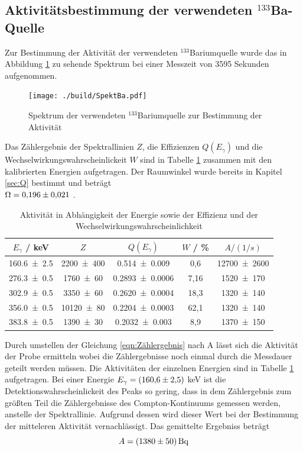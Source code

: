 \subsection{Aktivitätsbestimmung der verwendeten $^{133}$Ba-Quelle}
Zur Bestimmung der Aktivität der verwendeten $^{133}$Bariumquelle wurde das in Abbildung \ref{fig:BA} zu sehende Spektrum bei einer Messzeit von 3595 Sekunden aufgenommen.
\begin{figure}[H]
  \centering
  \texttt{[image: ./build/SpektBa.pdf]}
  \caption{Spektrum der verwendeten $^{133}$Bariumquelle zur Bestimmung der Aktivität}
  \label{fig:BA}
\end{figure}
Das Zählergebnis der Spektrallinien $Z$, die Effizienzen $Q(E_\gamma)$ und die Wechselwirkungswahrscheinlickeit $W$ sind in Tabelle \ref{tab:Ba} zusammen mit den kalibrierten Energien aufgetragen. Der Raumwinkel wurde bereits in Kapitel \ref{sec:Q} bestimmt und beträgt \\
$\Omega = \num{0,196 +- 0,021}$ .
\begin{table}
  \centering
  \caption{Aktivität in Abhängigkeit der Energie sowie der Effizienz und der Wechselwirkungswahrscheinlichkeit}
  \begin{tabular}{c c c c c}
    \toprule
	$E_\gamma$ / keV & $Z$ & $Q(E_\gamma)$ & $W$ / \%  & $A / (1/s)$\\
    \hline
    \num{160,6 +- 2,5}	& \num{2200 +- 400}	&\num{0,514 +- 0,009}      	& 0,6	&\num{12700 +- 2600}      \\
    \num{276,3 +- 0,5}  & \num{1760 +- 60}	&\num{0,2893 +- 0,0006} 	& 7,16 	&\num{1520 +- 170}  	\\
    \num{302,9 +- 0,5}	& \num{3350 +- 60} 	&\num{0,2620 +- 0,0004} 	& 18,3	&\num{1320 +- 140}   	\\
    \num{356,0 +- 0,5}	& \num{10120 +-	80}	&\num{0,2204 +- 0,0003} 	& 62,1	&\num{1320 +- 140}  	\\
    \num{383,8 +- 0,5}	& \num{1390 +- 30}	&\num{0,2032 +- 0,003} 		& 8,9	&\num{1370 +- 150}  	\\
    \bottomrule
  \end{tabular}
  \label{tab:Ba}
\end{table}
Durch umstellen der Gleichung \ref{eqn:Zählergebnis} nach A lässt sich die Aktivität der Probe ermitteln wobei die Zählergebnisse noch einmal durch die Messdauer geteilt werden müssen. Die Aktivitäten der einzelnen Energien sind in Tabelle \ref{tab:Ba} aufgetragen. Bei einer Energie $E_\gamma = (\num{160,6 +- 2,5})$ keV ist die Detektionswahrscheinlickeit des Peaks so gering, dass in dem  Zählergebnis zum größten Teil die Zählergebnisse des Compton-Kontinuums gemessen werden, anstelle der Spektrallinie. Aufgrund dessen wird dieser Wert bei der Bestimmung der mitteleren Aktivität vernachlässigt. Das gemittelte Ergebniss beträgt
\begin{equation}
  A = (\num{1380 +- 50}) \, \text{Bq}
  \label{eqn:aktBq}
\end{equation}
